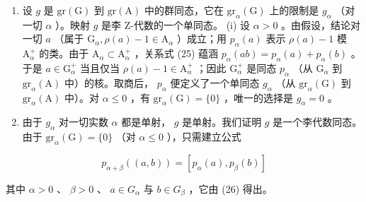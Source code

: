 \begin{enumerate}
\def\labelenumi{(\roman{enumi})}
\setcounter{enumi}{1}
\item
  设 \(g\) 是 \(\mathrm{gr}(\mathrm{G})\) 到 \(\mathrm{gr}(\mathrm{A})\) 中的群同态，它在 \(\mathrm{gr}_{\alpha}(\mathrm{G})\) 上的限制是 \(g_{\alpha}\) （对一切 \(\alpha\) ）。映射 \(g\) 是李 Z-代数的一个单同态。 (i) 设 \(\alpha > 0\) 。由假设，结论对一切 \(a\) （属于 \(\mathrm{G}_{\alpha}, \rho(a) - 1 \in \mathrm{A}_{\alpha}\) ）成立；用 \(p_{\alpha}(a)\) 表示 \(\rho(a) - 1\) 模 \(\mathrm{A}_{\alpha}^{+}\) 的类。由于 \(\mathrm{A}_{\alpha} \subset \mathrm{A}_{\alpha}^{+}\) ，关系式 (25) 蕴涵 \(p_{\alpha}(ab) = p_{\alpha}(a) + p_{\alpha}(b)\) 。于是 \(a \in \mathrm{G}_{\alpha}^{+}\) 当且仅当 \(\rho(a) - 1 \in \mathrm{A}_{\alpha}^{+}\) ；因此 \(\mathrm{G}_{\alpha}^{+}\) 是同态 \(p_{\alpha}\) （从 \(\mathrm{G}_{\alpha}\) 到 \(\mathrm{gr}_{\alpha}(\mathrm{A})\) 中）的核。取商后， \(p_{\alpha}\) 便定义了一个单同态 \(g_{\alpha}\) （从 \(\mathrm{gr}_{\alpha}(\mathrm{G})\) 到 \(\mathrm{gr}_{\alpha}(\mathrm{A})\) 中）。对 \(\alpha \leqslant 0\) ，有 \(\mathrm{gr}_{\alpha}(\mathrm{G}) = \{0\}\) ，唯一的选择是 \(g_{\alpha} = 0\) 。
\item
  由于 \(g_{\alpha}\) 对一切实数 \(\alpha\) 都是单射， \(g\) 是单射。我们证明 \(g\) 是一个李代数同态。由于 \(\mathrm{gr}_{\alpha}(\mathrm{G}) = \{0\}\) （对 \(\alpha \leqslant 0\) ），只需建立公式
\end{enumerate}

\[
p _ {\alpha + \beta} ((a, b)) = [ p _ {\alpha} (a), p _ {\beta} (b) ]\tag{27}
\]

其中 \(\alpha > 0\) 、 \(\beta > 0\) 、 \(a \in G_{\alpha}\) 与 \(b \in G_{\beta}\) ，它由 (26) 得出。

